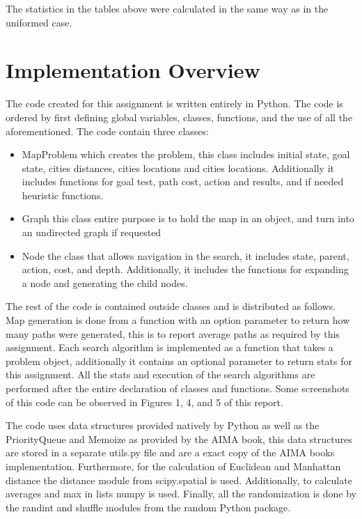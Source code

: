 \documentclass[12pt, letter]{article}
\begin{document}
\FloatBarrier

The statistics in the tables above were calculated in the same way as in the uniformed case.

\section{Implementation Overview}

The code created for this assignment is written entirely in Python. The code is ordered by first defining global variables, classes, functions, and the use of all the aforementioned. The code contain three classes: 

\begin{itemize}
	\item MapProblem which creates the problem, this class includes initial state, goal state, cities distances, cities locations and cities locations. Additionally it includes functions for goal test, path cost, action and results, and if needed heuristic functions. 
	\item Graph this class entire purpose is to hold the map in an object, and turn into an undirected graph if requested
	\item Node the class that allows navigation in the search, it includes state, parent, action, cost, and depth. Additionally, it includes the functions for expanding a node and generating the child nodes. 
\end{itemize}

The rest of the code is contained outside classes and is distributed as follows. Map generation is done from a function with an option parameter to return how many paths were generated, this is to report average paths as required by this assignment. Each search algorithm is implemented as a function that takes a problem object, additionally it contains an optional parameter to return stats for this assignment. All the stats and execution of the search algorithms are performed after the entire declaration of classes and functions. Some screenshots of this code can be observed in Figures 1, 4, and 5 of this report. 

The code uses data structures provided natively by Python as well as the PriorityQueue and Memoize as provided by the AIMA book, this data structures are stored in a separate utils.py file and are a exact copy of the AIMA books implementation. Furthermore, for the calculation of Euclidean and Manhattan distance the distance module from scipy.spatial is used. Additionally, to calculate averages and max in lists numpy is used. Finally, all the randomization is done by the randint and shuffle modules from the random Python package. 
\end{document}
